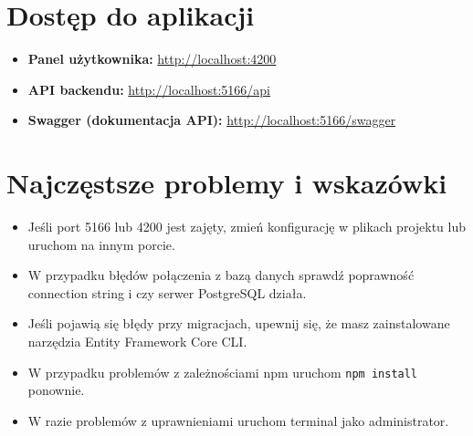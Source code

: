 \section{Dostęp do aplikacji}
\begin{itemize}
    \item \textbf{Panel użytkownika:} \url{http://localhost:4200}
    \item \textbf{API backendu:} \url{http://localhost:5166/api}
    \item \textbf{Swagger (dokumentacja API):} \url{http://localhost:5166/swagger}
\end{itemize}

\section{Najczęstsze problemy i wskazówki}
\begin{itemize}
    \item Jeśli port 5166 lub 4200 jest zajęty, zmień konfigurację w plikach projektu lub uruchom na innym porcie.
    \item W przypadku błędów połączenia z bazą danych sprawdź poprawność connection string i czy serwer PostgreSQL działa.
    \item Jeśli pojawią się błędy przy migracjach, upewnij się, że masz zainstalowane narzędzia Entity Framework Core CLI.
    \item W przypadku problemów z zależnościami npm uruchom \texttt{npm install} ponownie.
    \item W razie problemów z uprawnieniami uruchom terminal jako administrator.
\end{itemize}

